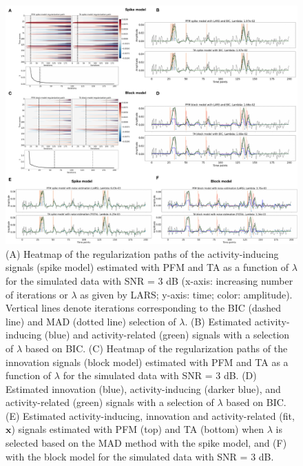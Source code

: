 \begin{figure}[t!]
    \begin{center}
        \includegraphics[width=\textwidth]{figures/figure_sim.pdf}
    \end{center}
    \caption{(A) Heatmap of the regularization paths of the activity-inducing signals (spike model) estimated with PFM and TA as a function of $\lambda$ for the simulated data with SNR = 3 dB (x-axis: increasing number of iterations or $\lambda$ as given by LARS; y-axis: time; color: amplitude). Vertical lines denote iterations corresponding to the BIC (dashed line) and MAD (dotted line) selection of $\lambda$. (B) Estimated activity-inducing (blue) and activity-related (green) signals with a selection of $\lambda$ based on BIC. (C) Heatmap of the regularization paths of the innovation signals (block model) estimated with PFM and TA as a function of $\lambda$ for the simulated data with SNR = 3 dB. (D) Estimated innovation (blue), activity-inducing (darker blue), and activity-related (green) signals with a selection of $\lambda$ based on BIC. (E) Estimated activity-inducing, innovation and activity-related (fit, $\mathbf{x}$) signals estimated with PFM (top) and TA (bottom) when $\lambda$ is selected based on the MAD method with the spike model, and (F) with the block model for the simulated data with SNR = 3 dB.}
\label{fig:sim}
\end{figure}


